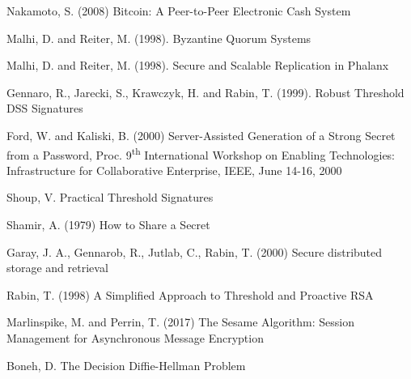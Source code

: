 \begin{thebibliography}{99}

  Nakamoto, S. (2008) Bitcoin: A Peer-to-Peer Electronic Cash System

  Malhi, D. and Reiter, M. (1998). Byzantine Quorum Systems

  Malhi, D. and Reiter, M. (1998). Secure and Scalable Replication in Phalanx

  Gennaro, R., Jarecki, S., Krawczyk, H. and Rabin, T. (1999). Robust
  Threshold DSS Signatures

  Ford, W. and Kaliski, B. (2000) Server-Assisted Generation of a
  Strong Secret from a Password, Proc. 9\textsuperscript{th} International
  Workshop on Enabling Technologies: Infrastructure for Collaborative
  Enterprise, IEEE, June 14-16, 2000

  Shoup, V. Practical Threshold Signatures
  
  Shamir, A. (1979) How to Share a Secret

  Garay, J. A., Gennarob, R., Jutlab, C., Rabin, T. (2000)  Secure
  distributed storage and retrieval

  Rabin, T. (1998) A Simplified Approach to Threshold and Proactive RSA

  Marlinspike, M. and Perrin, T. (2017) The Sesame Algorithm: Session Management for Asynchronous Message Encryption

  Boneh, D. The Decision Diffie-Hellman Problem

\end{thebibliography}
